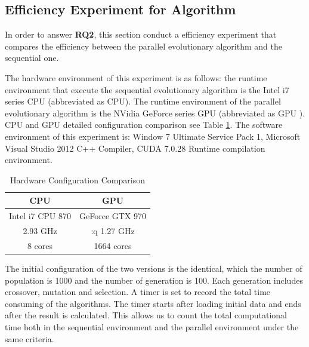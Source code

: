 \subsection{Efficiency Experiment for Algorithm}
%
In order to answer \textbf{RQ2}, this section conduct a efficiency experiment
that compares the efficiency between the parallel evolutionary algorithm and the
sequential one.

The hardware environment of this experiment is as follows: the runtime
environment that execute the sequential evolutionary algorithm is the Intel i7
series CPU (abbreviated as CPU). The runtime environment of the parallel
evolutionary algorithm is the NVidia GeForce series GPU (abbreviated as GPU
). CPU and GPU detailed configuration comparison see Table \ref{tab:cpugpu}. The
software environment of this experiment is: Window 7 Ultimate Service Pack 1,
Microsoft Visual Studio 2012 C++ Compiler, CUDA 7.0.28 Runtime compilation
environment.

\begin{table}[!ht]
  \centering
  \caption{Hardware Configuration Comparison}
  \label{tab:cpugpu}
  \begin{tabular}{c|c}
    \hline
    CPU & GPU  \\
    \hline
    \hspace{.5cm} Intel i7 CPU 870 \hspace{.5cm} & \hspace{.5cm} GeForce GTX 970 \hspace{.5cm} \\
    2.93 GHz &:q 1.27 GHz \\
    8 cores & 1664 cores \\
    \hline
  \end{tabular}
\end{table}

The initial configuration of the two versions is the identical, which the number
of population is 1000 and the number of generation is 100. Each generation
includes crossover, mutation and selection. A timer is set to record the total
time consuming of the algorithms. The timer starts after loading initial data
and ends after the result is calculated. This allows us to count the total
computational time both in the sequential environment and the parallel
environment under the same criteria.

